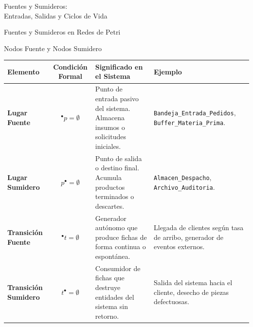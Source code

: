 \documentclass[10pt, aspectratio=169]{beamer}
\begin{document}
\begin{frame}{}
	\centering
	\Huge{Fuentes y Sumideros: \\ Entradas, Salidas y Ciclos de Vida}
\end{frame}

\begin{frame}{Fuentes y Sumideros en Redes de Petri}
	\begin{block}{Nodos Fuente y Nodos Sumidero}
		\begin{tabular}{|l|c|p{4.5cm}|p{4.8cm}|}
			\hline
			\textbf{Elemento} & \textbf{Condición Formal} & \textbf{Significado en el Sistema} & \textbf{Ejemplo} \\ \hline\hline
			\textbf{Lugar Fuente} & ${}^\bullet p = \emptyset$ & Punto de entrada pasivo del sistema. Almacena insumos o solicitudes iniciales. & \texttt{Bandeja\_Entrada\_Pedidos}, \texttt{Buffer\_Materia\_Prima}. \\ \hline
			\textbf{Lugar Sumidero} & $p^\bullet = \emptyset$ & Punto de salida o destino final. Acumula productos terminados o descartes. & \texttt{Almacen\_Despacho}, \texttt{Archivo\_Auditoria}. \\ \hline
			\textbf{Transición Fuente} & ${}^\bullet t = \emptyset$ & Generador autónomo que produce fichas de forma continua o espontánea. & Llegada de clientes según tasa de arribo, generador de eventos externos. \\ \hline
			\textbf{Transición Sumidero} & $t^\bullet = \emptyset$ & Consumidor de fichas que destruye entidades del sistema sin retorno. & Salida del sistema hacia el cliente, desecho de piezas defectuosas. \\ \hline
		\end{tabular}
	\end{block}
\end{frame}
\end{document}
